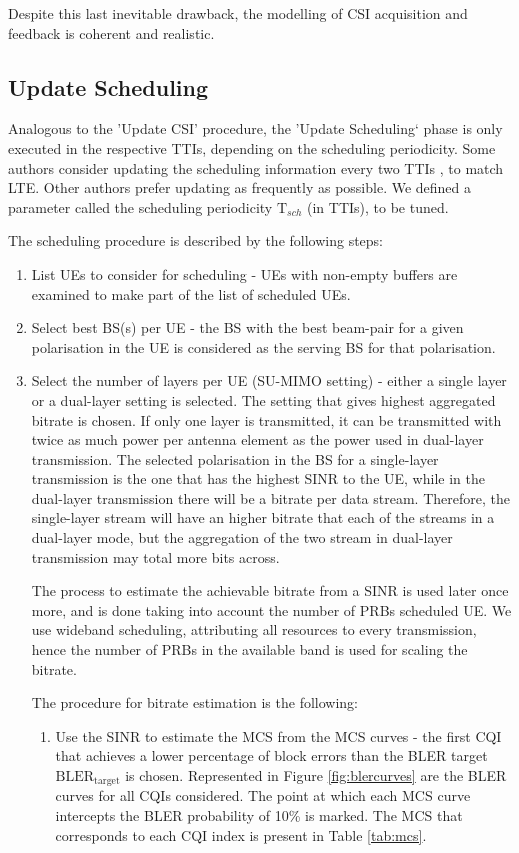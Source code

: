 Despite this last inevitable drawback, the modelling of \ac{CSI} acquisition and feedback is coherent and realistic.


\subsection{Update Scheduling}
Analogous to the 'Update CSI' procedure, the 'Update Scheduling` phase is only executed in the respective TTIs, depending on the scheduling periodicity. Some authors consider updating the scheduling information every two TTIs \cite{7986957}, to match LTE. Other authors \cite{dmimo-remco} prefer updating as frequently as possible. We defined a parameter called the scheduling periodicity $\text{T}_{sch}$ (in TTIs), to be tuned.



The scheduling procedure is described by the following steps:

\begin{enumerate}
    \item List UEs to consider for scheduling - UEs with non-empty buffers are examined to make part of the list of scheduled UEs. 
    \item Select best BS(s) per UE - the BS with the best beam-pair for a given polarisation in the UE is considered as the serving BS for that polarisation.
    \item Select the number of layers per UE (SU-MIMO setting) - either a single layer or a dual-layer setting is selected. The setting that gives highest aggregated bitrate is chosen. If only one layer is transmitted, it can be transmitted with twice as much power per antenna element as the power used in dual-layer transmission. The selected polarisation in the BS for a single-layer transmission is the one that has the highest SINR to the UE, while in the dual-layer transmission there will be a bitrate per data stream. Therefore, the single-layer stream will have an higher bitrate that each of the streams in a dual-layer mode, but the aggregation of the two stream in dual-layer transmission may total more bits across.
    
    The process to estimate the achievable bitrate from a SINR is used later once more, and is done taking into account the number of PRBs scheduled UE. We use wideband scheduling, attributing all resources to every transmission, hence the number of PRBs in the available band is used for scaling the bitrate. 
    
    The procedure for bitrate estimation is the following:
    \begin{enumerate}
        \item Use the SINR to estimate the MCS from the MCS curves - the first \ac{CQI} that achieves a lower percentage of block errors than the \ac{BLER} target $\text{BLER}_\text{target}$ is chosen. Represented in Figure \ref{fig:blercurves} are the BLER curves for all CQIs considered. The point at which each MCS curve intercepts the BLER probability of 10\% is marked. The MCS that corresponds to each CQI index is present in Table \ref{tab:mcs}.
    \end{enumerate}
\end{enumerate}


